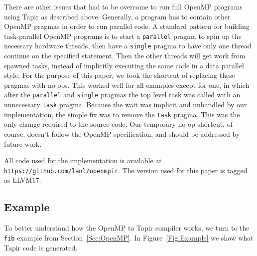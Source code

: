 \documentclass[sigconf]{acmart}
\begin{document}
There are other issues that had to be overcome to run full OpenMP programs
using Tapir as described above. Generally, a program has to contain other
OpenMP pragmas in order to run parallel code. A standard pattern for building
task-parallel OpenMP programs is to start a \texttt{parallel} pragma to spin up
the necessary hardware threads, then have a \texttt{single} pragma to have only
one thread continue on the specified statement. Then the other threads will get
work from spawned tasks, instead of implicitly executing the same code in a
data parallel style. For the purpose of this paper, we took the shortcut of
replacing these pragmas with no-ops. This worked well for all examples except
for one, in which after the \texttt{parallel} and \texttt{single} pragmas the
top level task was called with an unnecessary \texttt{task} pragma. Because the
wait was implicit and unhandled by our implementation, the simple fix was to
remove the \texttt{task} pragma. This was the only change required to the 
source code. Our temporary no-op shortcut, of course, doesn't follow the OpenMP
specification, and should be addressed by future work. 

All code used for the implementation is available at \\
\texttt{https://github.com/lanl/openmpir}. The version used for this paper is
tagged as LLVM17.

\subsection{Example} \label{Sec:Example}

To better understand how the OpenMP to Tapir compiler works, we turn to the
\texttt{fib} example from Section~\ref{Sec:OpenMP}. In Figure~\ref{Fig:Example}
we show what Tapir code is generated.  
\end{document}
